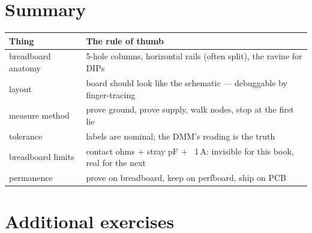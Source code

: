 \section{Summary}\label{sec:sum17}

\begin{center}
\begin{tabularx}{\linewidth}{@{}lX@{}}
\toprule
\textbf{Thing} & \textbf{The rule of thumb}\\
\midrule
breadboard anatomy & 5-hole columns, horizontal rails (often split),
the ravine for DIPs\\
layout & board should look like the schematic --- debuggable by
finger-tracing\\
measure method & prove ground, prove supply, walk nodes, stop at the
first lie\\
tolerance & labels are nominal; the DMM's reading is the truth\\
breadboard limits & contact ohms + stray pF + ~1\,A: invisible for
this book, real for the next\\
permanence & prove on breadboard, keep on perfboard, ship on PCB\\
\bottomrule
\end{tabularx}
\end{center}

\section*{Additional exercises}

